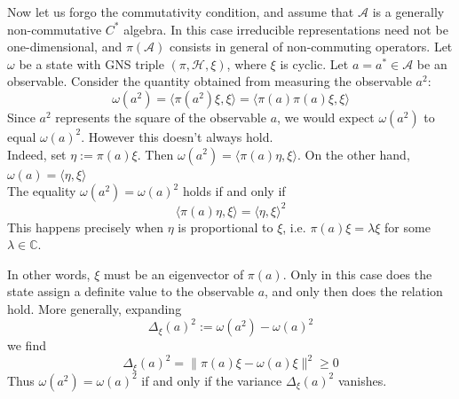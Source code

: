 \documentclass[
  12pt,
  a4paper, oneside
]{report}
\theoremstyle{bolddef}
\theoremstyle{remark}
\numberwithin{equation}{chapter}
\begin{document}
Now let us forgo the commutativity condition, and assume that $\mathcal A$ is a generally non-commutative $C^*$ algebra. 
In this case irreducible representations need not be one-dimensional, and 
$\pi(\mathcal A)$ consists in general of non-commuting operators. 
Let $\omega$ be a state with GNS triple $(\pi,\mathcal H,\xi)$, where $\xi$ is cyclic. 
Let $a=a^*\in\mathcal A$ be an observable. Consider the quantity obtained from measuring the observable $a^2$:
$$
\omega(a^2)
=
\langle \pi(a^2)\xi , \xi \rangle
=
\langle \pi(a)\pi(a)\xi , \xi \rangle
$$
Since $a^2$ represents the square of the observable $a$, we would expect $\omega(a^2)$ to equal  $\omega(a)^2.$
However this doesn't always hold.\\
Indeed, set
$\eta := \pi(a)\xi.$
Then
$\omega(a^2)
=
\langle \pi(a)\eta , \xi \rangle.$
On the other hand,
$\omega(a)
=
\langle \eta , \xi \rangle$
\\
The equality $\omega(a^2)=\omega(a)^2$ holds if and only if
$$
\langle \pi(a)\eta , \xi \rangle
=
\langle \eta , \xi \rangle^2
$$
This happens precisely when $\eta$ is proportional to $\xi$, i.e.
$\pi(a)\xi = \lambda \xi$
for some $\lambda\in\mathbb C$.

In other words, $\xi$ must be an eigenvector of $\pi(a)$. 
Only in this case does the state assign a definite value to the observable $a$, and 
only then does the relation hold.
More generally, expanding
$$
\Delta_\xi(a)^2
:=
\omega(a^2)-\omega(a)^2
$$
we find
$$
\Delta_\xi(a)^2
=
\|\pi(a)\xi - \omega(a)\xi\|^2 \ge 0
$$
Thus $\omega(a^2)=\omega(a)^2$ if and only if the variance $\Delta_\xi(a)^2$ vanishes.
\end{document}
